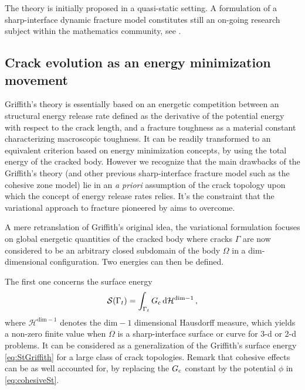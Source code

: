 The theory is initially proposed in a quasi-static setting. A formulation of a sharp-interface dynamic fracture model constitutes still an on-going research subject within the mathematics community, see \cite{Larsen:2010}.

\subsection{Crack evolution as an energy minimization movement} \label{sec:fm98sharp}
Griffith's theory is essentially based on an energetic competition between an structural energy release rate defined as the derivative of the potential energy with respect to the crack length, and a fracture toughness as a material constant characterizing macroscopic toughness. It can be readily transformed to an equivalent criterion based on energy minimization concepts, by using the total energy of the cracked body. However we recognize that the main drawbacks of the Griffith's theory (and other previous sharp-interface fracture model such as the cohesive zone model) lie in an \emph{a priori} assumption of the crack topology upon which the concept of energy release rates relies. It's the constraint that the variational approach to fracture pioneered by \cite{FrancfortMarigo:1998} aims to overcome.

A mere retranslation of Griffith's original idea, the variational formulation focuses on global energetic quantities of the cracked body where cracks $\Gamma$ are now considered to be an arbitrary closed subdomain of the body $\Omega$ in a $\mathrm{dim}$-dimensional configuration. Two energies can then be defined.

The first one concerns the surface energy
\begin{equation} \label{eq:SGamma}
\mathcal{S}(\Gamma_t)=\int_{\Gamma_t}G_\mathrm{c}\,\mathrm{d}\mathcal{H}^{\mathrm{dim}-1}\,,
\end{equation}
where $\mathcal{H}^{\mathrm{dim}-1}$ denotes the $\mathrm{dim}-1$ dimensional Hausdorff measure, which yields a non-zero finite value when $\Omega$ is a sharp-interface surface or curve for 3-d or 2-d problems. It can be considered as a generalization of the Griffith's surface energy \eqref{eq:StGriffith} for a large class of crack topologies. Remark that cohesive effects can be as well accounted for, by replacing the $G_\mathrm{c}$ constant by the potential $\phi$ in \eqref{eq:cohesiveSt}.

